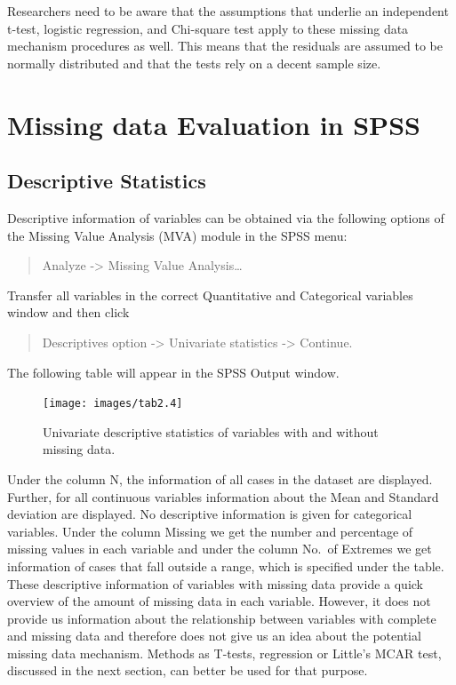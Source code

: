 \documentclass[
]{book}
\begin{document}
Researchers need to be aware that the assumptions that underlie an independent t-test, logistic regression, and Chi-square test apply to these missing data mechanism procedures as well. This means that the residuals are assumed to be normally distributed and that the tests rely on a decent sample size.

\hypertarget{missing-data-evaluation-in-spss}{%
\section{Missing data Evaluation in SPSS}\label{missing-data-evaluation-in-spss}}

\hypertarget{descriptive-statistics}{%
\subsection{Descriptive Statistics}\label{descriptive-statistics}}

Descriptive information of variables can be obtained via the following options of the Missing Value Analysis (MVA) module in the SPSS menu:

\begin{quote}
Analyze -\textgreater{} Missing Value Analysis\ldots{}
\end{quote}

Transfer all variables in the correct Quantitative and Categorical variables window and then click

\begin{quote}
Descriptives option -\textgreater{} Univariate statistics -\textgreater{} Continue.
\end{quote}

The following table will appear in the SPSS Output window.

\begin{figure}

{\centering \texttt{[image: images/tab2.4]} 

}

\caption{Univariate descriptive statistics of variables with and without missing data.}\label{fig:tab2-4}
\end{figure}

Under the column N, the information of all cases in the dataset are displayed. Further, for all continuous variables information about the Mean and Standard deviation are displayed. No descriptive information is given for categorical variables. Under the column Missing we get the number and percentage of missing values in each variable and under the column No.~of Extremes we get information of cases that fall outside a range, which is specified under the table. These descriptive information of variables with missing data provide a quick overview of the amount of missing data in each variable. However, it does not provide us information about the relationship between variables with complete and missing data and therefore does not give us an idea about the potential missing data mechanism. Methods as T-tests, regression or Little's MCAR test, discussed in the next section, can better be used for that purpose.
\end{document}
